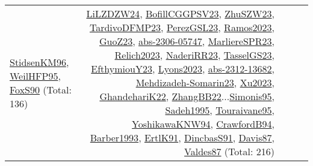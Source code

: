 {\begin{longtable}{p{3cm}r>{\raggedright\arraybackslash}p{6cm}>{\raggedright\arraybackslash}p{6cm}>{\raggedright\arraybackslash}p{8cm}}
\hyperref[detail:StidsenKM96]{StidsenKM96}, \hyperref[detail:WeilHFP95]{WeilHFP95}, \hyperref[detail:FoxS90]{FoxS90} (Total: 136) & \hyperref[detail:LiLZDZW24]{LiLZDZW24}, \hyperref[detail:BofillCGGPSV23]{BofillCGGPSV23}, \hyperref[detail:ZhuSZW23]{ZhuSZW23}, \hyperref[detail:TardivoDFMP23]{TardivoDFMP23}, \hyperref[detail:PerezGSL23]{PerezGSL23}, \hyperref[detail:Ramos2023]{Ramos2023}, \hyperref[detail:GuoZ23]{GuoZ23}, \hyperref[detail:abs-2306-05747]{abs-2306-05747}, \hyperref[detail:MarliereSPR23]{MarliereSPR23}, \hyperref[detail:Relich2023]{Relich2023}, \hyperref[detail:NaderiRR23]{NaderiRR23}, \hyperref[detail:TasselGS23]{TasselGS23}, \hyperref[detail:EfthymiouY23]{EfthymiouY23}, \hyperref[detail:Lyons2023]{Lyons2023}, \hyperref[detail:abs-2312-13682]{abs-2312-13682}, \hyperref[detail:Mehdizadeh-Somarin23]{Mehdizadeh-Somarin23}, \hyperref[detail:Xu2023]{Xu2023}, \hyperref[detail:GhandehariK22]{GhandehariK22}, \hyperref[detail:ZhangBB22]{ZhangBB22}...\hyperref[detail:Simonis95]{Simonis95}, \hyperref[detail:Sadeh1995]{Sadeh1995}, \hyperref[detail:Touraivane95]{Touraivane95}, \hyperref[detail:YoshikawaKNW94]{YoshikawaKNW94}, \hyperref[detail:CrawfordB94]{CrawfordB94}, \hyperref[detail:Barber1993]{Barber1993}, \hyperref[detail:ErtlK91]{ErtlK91}, \hyperref[detail:DincbasS91]{DincbasS91}, \hyperref[detail:Davis87]{Davis87}, \hyperref[detail:Valdes87]{Valdes87} (Total: 216)\\
\end{longtable}
}

\clearpage
